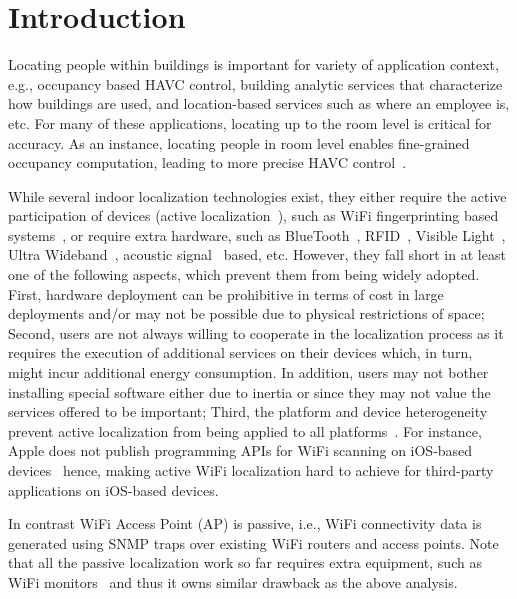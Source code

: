 \section{Introduction}
\label{sec:intro}


Locating people within buildings is important for variety of application context, e.g., occupancy based HAVC control, building analytic services
that characterize how buildings are used, and location-based services such as
where an employee is, etc. For many of these applications, locating up to the room level is critical for accuracy. As an instance, locating people in room level enables fine-grained occupancy computation, leading to more precise HAVC control~\cite{afram2014theory}.

 While several indoor localization technologies exist, they either require the active participation of devices (active localization~\cite{deak2012survey}), such as WiFi fingerprinting based systems~\cite{kotaru2015spotfi}, or require extra hardware, such as BlueTooth~\cite{diaz2010bluepass}, RFID~\cite{shirehjini2012rfid}, Visible Light~\cite{kuo2014luxapose}, Ultra Wideband~\cite{gezici2005localization}, acoustic signal~\cite{huang2015swadloon} based, etc. However, they fall short in at least one of the following aspects, which prevent them from being widely adopted. First, hardware deployment can be prohibitive in terms of cost in large deployments and/or may not be possible due to physical restrictions of space; Second, users are not always willing to cooperate in the localization process as it requires the execution of additional services on their devices which, in turn, might incur additional energy consumption. In addition, users may not bother installing special software either due to inertia or since they may not value the services offered to be important; Third, the platform and device heterogeneity prevent active localization from being applied to all platforms~\cite{apple}. For instance, Apple does not publish programming APIs for WiFi scanning on iOS-based devices~\cite{zeinalipour2017anatomy} hence, making active WiFi localization hard to achieve for third-party applications on iOS-based devices. 

In contrast WiFi Access Point (AP) is passive, i.e., WiFi connectivity data is generated using SNMP traps over existing WiFi routers and access points. Note that all the passive localization work so far requires extra equipment, such as WiFi monitors~\cite{youssef2007challenges,xu2013scpl,seifeldin2013nuzzer,musa2012tracking} and thus it owns similar drawback as the above analysis. 

